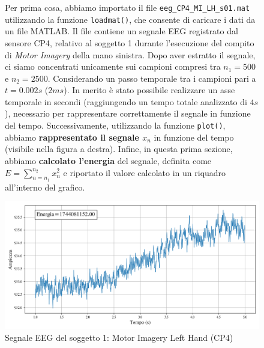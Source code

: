 \documentclass{report}
\begin{document}
\begin{figure}[!h]
\begin{minipage}{0.4\textwidth} 
Per prima cosa, abbiamo importato il file \texttt{eeg\_CP4\_MI\_LH\_s01.mat} utilizzando la funzione \texttt{loadmat()}\footnotemark, che consente di caricare i dati da un file MATLAB. Il file contiene un segnale EEG registrato dal sensore CP4, relativo al soggetto 1 durante l'esecuzione del compito di \textit{Motor Imagery} della mano sinistra. Dopo aver estratto il segnale, ci siamo concentrati unicamente sui campioni compresi tra $n_1 = 500$ e $n_2 = 2500$. Considerando un passo temporale tra i campioni pari a $t = 0.002 s$ ($2 ms$). In merito è stato possibile realizzare un asse temporale in secondi (raggiungendo un tempo totale analizzato di $4 s$), necessario per rappresentare correttamente il segnale in funzione del tempo. Successivamente, utilizzando la funzione \texttt{plot()}\footnotemark, abbiamo \textbf{rappresentato il segnale $x_n$} in funzione del tempo (visibile nella figura a destra). Infine, in questa prima sezione, abbiamo \textbf{calcolato l'energia} del segnale, definita come $E = \sum_{n=n_1}^{n_2} x_n^2$ e riportato il valore calcolato in un riquadro all'interno del grafico.
\end{minipage}
\hfill
\hspace{0.5cm}
\begin{minipage}{0.55\textwidth}
\centering
\includegraphics[width=\textwidth]{plot1}
\caption{Segnale EEG del soggetto 1: Motor Imagery Left Hand (CP4)}    
\end{minipage}
\end{figure}

\end{document}
